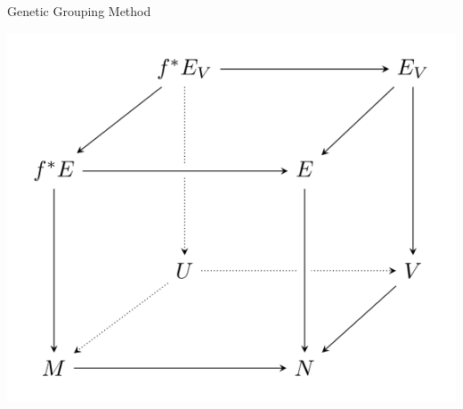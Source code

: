 \documentclass[a0paper,fleqn]{betterposter}
\begin{document}
{Genetic Grouping Method
\begin{center}
\includegraphics[width=\textwidth]{img/tikzexample2}
\end{center}
}
\end{document}
